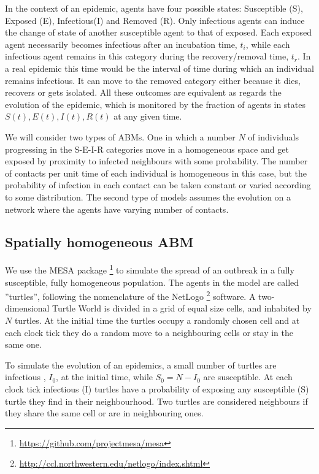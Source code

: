 \documentclass[a4paper,oneside,11pt]{article}
\begin{document}
In the context of an epidemic, agents have four possible states: Susceptible (S), Exposed (E), Infectious(I) and Removed (R). Only infectious agents can induce the change of state of another susceptible agent to that of exposed. Each exposed agent necessarily becomes infectious after an incubation time, $t_i$, while each infectious agent remains in this category during the recovery/removal time, $t_r$. In a real epidemic this time would be the interval of time during which an individual remains infectious. It can move to the removed
category either because it dies, recovers or gets isolated. All these outcomes are equivalent as regards the evolution of the epidemic, which 
 is monitored by the fraction of agents in states $S(t), E(t), I(t), R(t)$ at any given time. 

We will consider two types of ABMs. One in which a number $N$ of individuals progressing in the S-E-I-R categories move in a homogeneous space and get exposed by proximity to infected neighbours with some probability. The number of contacts per unit time of each individual is homogeneous in this case, but the probability of infection in each contact can be taken constant or varied according to some distribution.
The second type of models assumes the evolution  on a network where the agents have varying number of contacts. 

\subsection{Spatially homogeneous ABM}

We use the MESA package \footnote{\url{https://github.com/projectmesa/mesa}} to simulate the spread of an outbreak in a fully susceptible, fully homogeneous population. The agents in the model are called ''turtles'', following the nomenclature of the NetLogo \footnote{\url{http://ccl.northwestern.edu/netlogo/index.shtml}} software. 
A two-dimensional Turtle World is divided in a grid of equal size cells, and inhabited by $N$ turtles. At the initial time the turtles occupy a randomly chosen cell and  at each clock tick they do a random move to a neighbouring cells or stay in the same one. 

To simulate the evolution of an epidemics, a small number of turtles are infectious , $I_0$, at the initial time, while $S_0 = N-I_0$ are susceptible. At each clock tick infectious (I) turtles have a probability of exposing any susceptible (S) turtle they find in their neighbourhood. Two turtles are considered neighbours if they share the same cell or are in  neighbouring ones. 
\end{document}
